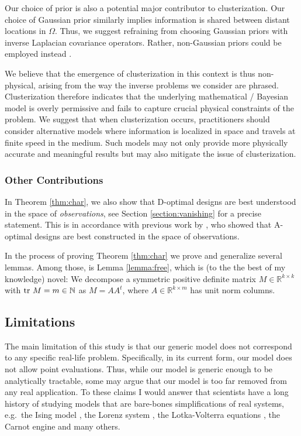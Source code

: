 Our choice of prior is also a potential major contributor to
clusterization. Our choice of Gaussian prior similarly implies
information is shared between distant locations in $\Omega$. Thus, we
suggest refraining from choosing Gaussian priors with inverse
Laplacian covariance operators. Rather, non-Gaussian priors could be
employed instead \cite{hosseini2017, hosseini2019}.

We believe that the emergence of clusterization in this context is
thus non-physical, arising from the way the inverse problems we
consider are phrased. Clusterization therefore indicates that the
underlying mathematical / Bayesian model is overly permissive and
fails to capture crucial physical constraints of the problem. We
suggest that when clusterization occurs, practitioners should consider
alternative models where information is localized in space and travels
at finite speed in the medium. Such models may not only provide more
physically accurate and meaningful results but may also mitigate the
issue of clusterization.



\subsubsection{Other Contributions}
In Theorem \ref{thm:char}, we also show that D-optimal designs are
best understood in the space of \emph{observations}, see Section
\ref{section:vanishing} for a precise statement. This is in accordance
with previous work by \cite{koval2020}, who showed that A-optimal
designs are best constructed in the space of observations.

In the process of proving Theorem \ref{thm:char} we prove and
generalize several lemmas. Among those, is Lemma \ref{lemma:free},
which is (to the the best of my knowledge) novel: We decompose a
symmetric positive definite matrix \(M \in \mathbb{R}^{k \times k}\)
with \(\textup{tr}\ M = m \in \mathbb{N}\) as \(M = AA^t\), where \(A\in
\mathbb{R}^{k \times m}\) has unit norm columns.


\subsection{Limitations}\label{subsec:limitations}
The main limitation of this study is that our generic model does not
correspond to any specific real-life problem. Specifically, in its
current form, our model does not allow point evaluations. Thus, while
our model is generic enough to be analytically tractable, some may
argue that our model is too far removed from any real application. To
these claims I would answer that scientists have a long history of
studying models that are bare-bones simplifications of real systems,
e.g.~the Ising model \cite{cipra1987}, the Lorenz system \cite{brin},
the Lotka-Volterra equations \cite{logan2006}, the Carnot engine
\cite{kardar2007} and many others.
